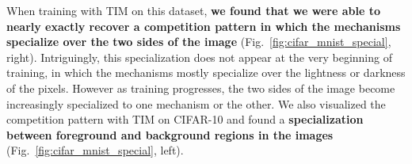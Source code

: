 \documentclass{article}
\newcommand{\highlight}[1]{\colorbox{blue!10}{#1}}
\begin{document}
When training with TIM on this dataset, {\bf we found that we were able to nearly exactly recover a competition pattern in which the mechanisms specialize over the two sides of the image } (Fig.~\ref{fig:cifar_mnist_special}, right).  Intriguingly, this specialization does not appear at the very beginning of training, in which the mechanisms mostly specialize over the lightness or darkness of the pixels.  However as training progresses, the two sides of the image become increasingly specialized to one mechanism or the other.  We also visualized the competition pattern with TIM on CIFAR-10 and found a {\bf specialization between foreground and background regions in the images} (Fig.~\ref{fig:cifar_mnist_special}, left).  





\end{document}
